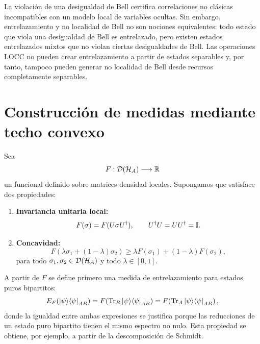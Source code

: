\documentclass[../main.tex]{subfiles}
\begin{document}
\begin{observacion}
La violación de una desigualdad de Bell certifica correlaciones no clásicas incompatibles con un modelo local de variables ocultas. Sin embargo, entrelazamiento y no localidad de Bell no son nociones equivalentes: todo estado que viola una desigualdad de Bell es entrelazado, pero existen estados entrelazados mixtos que no violan ciertas desigualdades de Bell. Las operaciones LOCC no pueden crear entrelazamiento a partir de estados separables y, por tanto, tampoco pueden generar no localidad de Bell desde recursos completamente separables.
\end{observacion}

\section{Construcción de medidas mediante techo convexo}

Sea
\begin{equation*}
    F:\mathcal D(\mathcal{H}_A)\longrightarrow \mathbb{R}
\end{equation*}
un funcional definido sobre matrices densidad locales. Supongamos que satisface dos propiedades:
\begin{enumerate}
    \item \textbf{Invariancia unitaria local:}
    \begin{equation}
        F(\sigma)=F(U\sigma U^\dagger),
        \qquad
        U^\dagger U=UU^\dagger=\mathbb{I}.
        \label{eq:F-invariante-unitaria}
    \end{equation}
    \item \textbf{Concavidad:}
    \begin{equation}
        F(\lambda\sigma_1+(1-\lambda)\sigma_2)
        \geq
        \lambda F(\sigma_1)+(1-\lambda)F(\sigma_2),
        \label{eq:F-concava}
    \end{equation}
    para todo \(\sigma_1,\sigma_2\in\mathcal D(\mathcal{H}_A)\) y todo \(\lambda\in[0,1]\).
\end{enumerate}

A partir de \(F\) se define primero una medida de entrelazamiento para estados puros bipartitos:
\begin{equation}
    E_F(\ket{\psi}\!\bra{\psi}_{AB})
    =F\!\left(\Tr_B\ket{\psi}\!\bra{\psi}_{AB}\right)
    =F\!\left(\Tr_A\ket{\psi}\!\bra{\psi}_{AB}\right),
    \label{eq:entrelazamiento-puro-F}
\end{equation}
donde la igualdad entre ambas expresiones se justifica porque las reducciones de un estado puro bipartito tienen el mismo espectro no nulo. Esta propiedad se obtiene, por ejemplo, a partir de la descomposición de Schmidt.
\end{document}

